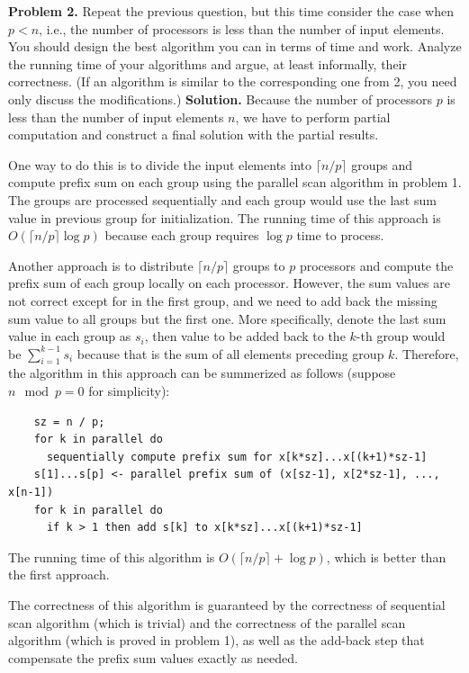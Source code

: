 \documentclass{article}
\theoremstyle{definition}
\newenvironment{problem}[1]{\noindent\textbf{Problem #1.}}{\bigbreak}
\newenvironment{solution}{\noindent\textbf{Solution.}}{\bigbreak}
\begin{document}
\begin{problem}{2} Repeat the previous question, but this time consider
  the case when $p < n$, i.e., the number of processors is less than
  the number of input elements. You should design the best algorithm
  you can in terms of time and work. Analyze the running time of your
  algorithms and argue, at least informally, their correctness.
  (If an algorithm is similar to the corresponding one from 2, you need only discuss the modifications.)
\end{problem}
\begin{solution}
  Because the number of processors $p$ is less than the number of input elements $n$, we have to perform partial computation
  and construct a final solution with the partial results.

  One way to do this is to divide the input elements into $\lceil n/p \rceil$ groups and compute prefix sum on each group using
  the parallel scan algorithm in problem 1. The groups are processed sequentially and each group would use the last sum value in
  previous group for initialization. The running time of this approach is $O(\lceil n/p \rceil \log{p})$ because each group requires $\log{p}$ time
  to process.

  Another approach is to distribute $\lceil n/p \rceil$ groups to $p$ processors and compute the prefix sum of each group locally on each
  processor. However, the sum values are not correct except for in the first group, and we need to add back the missing sum value to
  all groups but the first one. More specifically, denote the last sum value in each group as $s_i$, then value to be added back to the
  $k$-th group would be $\sum_{i=1}^{k-1}s_i$ because that is the sum of all elements preceding group $k$. Therefore, the algorithm in this
  approach can be summerized as follows (suppose $n \mod p = 0$ for simplicity):
  \begin{lstlisting}
    sz = n / p;
    for k in parallel do
      sequentially compute prefix sum for x[k*sz]...x[(k+1)*sz-1]
    s[1]...s[p] <- parallel prefix sum of (x[sz-1], x[2*sz-1], ..., x[n-1])
    for k in parallel do
      if k > 1 then add s[k] to x[k*sz]...x[(k+1)*sz-1]
  \end{lstlisting}
  The running time of this algorithm is $O(\lceil n/p \rceil + \log p)$, which is better than the first approach.

  The correctness of this algorithm is guaranteed by the correctness of sequential scan algorithm (which is trivial) and the correctness of the parallel
  scan algorithm (which is proved in problem 1), as well as the add-back step that compensate the prefix sum values exactly as needed.
\end{solution}
\end{document}
